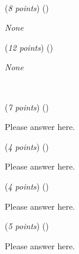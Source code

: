 \documentclass{template}
\begin{document}
\begin{problem}
~\newline
~\newline


\begin{subproblem}
(\textit{8 points}) (\scorecodeemoji{})


\end{subproblem}

\begin{solution}
\textit{None}
\end{solution}

\begin{subproblem}
(\textit{12 points}) (\scorecodeemoji{})


\end{subproblem}

\begin{solution}
\textit{None}
\end{solution}
\end{problem}

\newpage

\begin{problem}
~\newline
~\newline


\begin{subproblem}
(\textit{7 points}) (\scoretextemoji{}\scorecodeemoji{})


\end{subproblem}

\begin{solution}
Please answer here.
\end{solution}

\begin{subproblem}
(\textit{4 points}) (\scoretextemoji{}\scorecodeemoji{})


\end{subproblem}

\begin{solution}
Please answer here.
\end{solution}

\begin{subproblem}
(\textit{4 points}) (\scoretextemoji{}\scorecodeemoji{})


\end{subproblem}

\begin{solution}
Please answer here.
\end{solution}

\begin{subproblem}
(\textit{5 points}) (\scoretextemoji{}\scoreplotemoji{})


\end{subproblem}

\begin{solution}
Please answer here.
\end{solution}
\end{problem}
\end{document}
